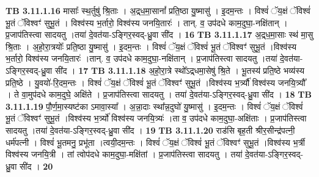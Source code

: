 \documentclass[17pt]{extarticle}
\begin{document}
{{{{{{{{{{{{{{{{{{{{{{                                \textbf{ TB 3.11.1.16} \newline
                  मासाः᳚ स्थ॒र्तुषु॑ श्रि॒ताः । अ॒द्र्ध॒मा॒सानां᳚ प्रति॒ष्ठा यु॒ष्मासु॑ । इ॒दम॒न्तः । विश्वं॑ ॅय॒क्षं ॅविश्वं॑ भू॒तं ॅविश्वꣳ॑ सुभू॒तं । विश्व॑स्य भ॒र्तारो॒ विश्व॑स्य जनयि॒तारः॑ । तान्. व॒ उप॑दधे काम॒दुघा॒-नक्षि॑तान् । प्र॒जाप॑तिस्त्वा सादयतु ।तया॑ दे॒वत॑या-ऽङ्गिर॒स्वद्-ध्रु॒वा सी॑द । \textbf{ 16} \newline
                  \newline
                                \textbf{ TB 3.11.1.17} \newline
                  अ॒द्र्ध॒मा॒साः स्थ॑ मा॒सु श्रि॒ताः । अ॒हो॒रा॒त्रयोः᳚ प्रति॒ष्ठा यु॒ष्मासु॑ । इ॒दम॒न्तः । विश्वं॑ ॅय॒क्षं ॅविश्वं॑ भू॒तं ॅविश्वꣳ॑ सुभू॒तं ।विश्व॑स्य भ॒र्तारो॒ विश्व॑स्य जनयि॒तारः॑ ।तान्. व॒ उप॑दधे काम॒दुघा॒-नक्षि॑तान् । प्र॒जाप॑तिस्त्वा सादयतु ।तया॑ दे॒वत॑या-ऽङ्गिर॒स्वद्-ध्रु॒वा सी॑द । \textbf{ 17} \newline
                  \newline
                                \textbf{ TB 3.11.1.18} \newline
                  अ॒हो॒रा॒त्रे स्थो᳚ऽद्र्धमा॒सेषु॑ श्रि॒ते । भू॒तस्य॑ प्रति॒ष्ठे भव्य॑स्य प्रति॒ष्ठे । यु॒वयो॑-रि॒दम॒न्तः । विश्वं॑ ॅय॒क्षं ॅविश्वं॑ भू॒तं ॅविश्वꣳ॑ सुभू॒तं ।विश्व॑स्य भ॒र्त्र्यौ॑ विश्व॑स्य जनयि॒त्र्यौ᳚ । ते वा॒मुप॑दधे काम॒दुघे॒ अक्षि॑ते । प्र॒जाप॑तिस्त्वा सादयतु । तया॑ दे॒वत॑या-ऽङ्गिर॒स्वद्-ध्रु॒वा सी॑द । \textbf{ 18} \newline
                  \newline
                                \textbf{ TB 3.11.1.19} \newline
                  पौ॒र्ण॒मा॒स्यष्ट॑का ऽमावा॒स्या᳚ । अ॒न्ना॒दाः स्था᳚न्न॒दुघो॑ यु॒ष्मासु॑ । इ॒दम॒न्तः । विश्वं॑ ॅय॒क्षं ॅविश्वं॑ भू॒तं ॅविश्वꣳ॑ सुभू॒तं ।विश्व॑स्य भ॒र्त्र्यो॑ विश्व॑स्य जनयि॒त्र्यः॑ ।ता व॒ उप॑दधे काम॒दुघा॒-अक्षि॑ताः । प्र॒जाप॑तिस्त्वा सादयतु ।तया॑ दे॒वत॑या-ऽङ्गिर॒स्वद्-ध्रु॒वा सी॑द । \textbf{ 19} \newline
                  \newline
                                \textbf{ TB 3.11.1.20} \newline
                  राड॑सि बृह॒ती श्रीर॒सीन्द्र॑पत्नी॒ धर्म॑पत्नी । विश्वं॑ भू॒तमनु॒ प्रभू॑ता ।त्वयी॒दम॒न्तः । विश्वं॑ ॅय॒क्षं ॅविश्वं॑ भू॒तं ॅविश्वꣳ॑ सुभू॒तं ।विश्व॑स्य भ॒र्त्री विश्व॑स्य जनयि॒त्री । तां त्वोप॑दधे काम॒दुघा॒-मक्षि॑तां । प्र॒जाप॑तिस्त्वा सादयतु । तया॑ दे॒वत॑या-ऽङ्गिर॒स्वद्-ध्रु॒वा सी॑द । \textbf{ 20} \newline
}}}}}}}}}}}}}}}}}}}}}}
\end{document}
